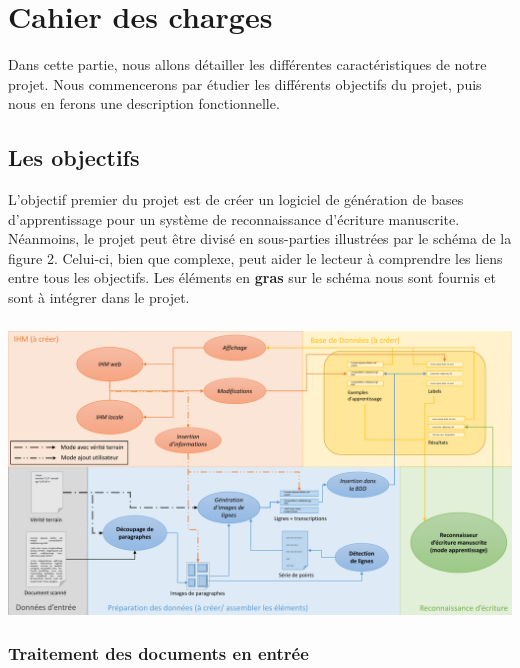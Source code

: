 \hypertarget{c4}{\chapter{Cahier des charges}}

Dans cette partie, nous allons détailler les différentes caractéristiques de notre projet.
Nous commencerons par étudier les différents objectifs du projet, puis nous en ferons
une description fonctionnelle.

\section{Les objectifs}

L’objectif premier du projet est de créer un logiciel de génération de bases d’apprentissage
pour un système de reconnaissance d’écriture manuscrite. Néanmoins, le projet peut être divisé
en sous-parties illustrées par le schéma de la figure 2. Celui-ci, bien que complexe, peut aider le
lecteur à comprendre les liens entre tous les objectifs. Les éléments en \textbf{gras} sur le
schéma nous sont fournis et sont à intégrer dans le projet.

\paragraph{}
\begin{mdframed}[frametitle={Figure 2 : Schéma résumant les différents aspects du projet}, innerbottommargin=10]
\begin{center}
\includegraphics[width=\linewidth]{schema_mode1.1.pdf}
\end{center}
\end{mdframed}

\subsection{Traitement des documents en entrée}

